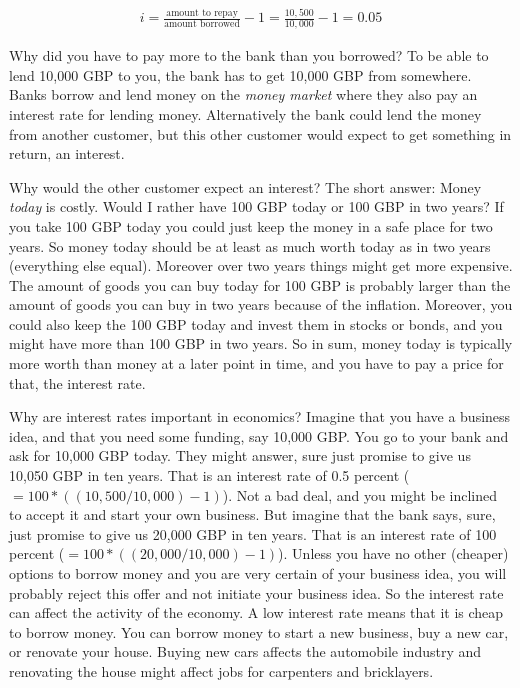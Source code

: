 \documentclass[
]{book}
\begin{document}
\begin{align}
    i=\frac{\text{amount to repay}}{\text{amount borrowed}}-1=\frac{10,500}{10,000}-1=0.05
\end{align}

Why did you have to pay more to the bank than you borrowed? To be able to lend 10,000 GBP to you, the bank has to get 10,000 GBP from somewhere. Banks borrow and lend money on the \emph{money market} where they also pay an interest rate for lending money. Alternatively the bank could lend the money from another customer, but this other customer would expect to get something in return, an interest.

Why would the other customer expect an interest? The short answer: Money \emph{today} is costly. Would I rather have 100 GBP today or 100 GBP in two years? If you take 100 GBP today you could just keep the money in a safe place for two years. So money today should be at least as much worth today as in two years (everything else equal). Moreover over two years things might get more expensive. The amount of goods you can buy today for 100 GBP is probably larger than the amount of goods you can buy in two years because of the inflation. Moreover, you could also keep the 100 GBP today and invest them in stocks or bonds, and you might have more than 100 GBP in two years. So in sum, money today is typically more worth than money at a later point in time, and you have to pay a price for that, the interest rate.

Why are interest rates important in economics? Imagine that you have a business idea, and that you need some funding, say 10,000 GBP. You go to your bank and ask for 10,000 GBP today. They might answer, sure just promise to give us 10,050 GBP in ten years. That is an interest rate of 0.5 percent (\(=100*((10,500/10,000)-1)\)). Not a bad deal, and you might be inclined to accept it and start your own business. But imagine that the bank says, sure, just promise to give us 20,000 GBP in ten years. That is an interest rate of 100 percent (\(=100*((20,000/10,000)-1)\)). Unless you have no other (cheaper) options to borrow money and you are very certain of your business idea, you will probably reject this offer and not initiate your business idea. So the interest rate can affect the activity of the economy. A low interest rate means that it is cheap to borrow money. You can borrow money to start a new business, buy a new car, or renovate your house. Buying new cars affects the automobile industry and renovating the house might affect jobs for carpenters and bricklayers.
\end{document}
